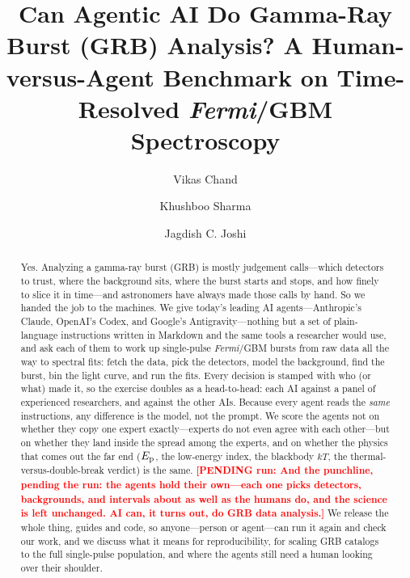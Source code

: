 \documentclass[twocolumn]{aastex631}
\newcommand{\PENDING}[1]{\textbf{\textcolor{red}{[PENDING run: #1]}}}
\newcommand{\Ep}{E_{\rm p}}
\newcommand{\kT}{kT}
\begin{document}
\title{Can Agentic AI Do Gamma-Ray Burst (GRB) Analysis?
A Human-versus-Agent Benchmark on Time-Resolved \textit{Fermi}/GBM Spectroscopy}

\author{Vikas Chand}

\author{Khushboo Sharma}

\author{Jagdish C. Joshi}

\begin{abstract}
Yes. Analyzing a gamma-ray burst (GRB) is mostly judgement calls---which detectors to
trust, where the background sits, where the burst starts and stops, and how finely to
slice it in time---and astronomers have always made those calls by hand. So we handed
the job to the machines. We give today's leading AI agents---Anthropic's Claude,
OpenAI's Codex, and Google's Antigravity---nothing but a set of plain-language
instructions written in Markdown and the same tools a researcher would use, and ask
each of them to work up single-pulse \textit{Fermi}/GBM bursts from raw data all the
way to spectral fits: fetch the data, pick the detectors, model the background, find
the burst, bin the light curve, and run the fits. Every decision is stamped with who
(or what) made it, so the exercise doubles as a head-to-head: each AI against a panel
of experienced researchers, and against the other AIs. Because every agent reads the
\emph{same} instructions, any difference is the model, not the prompt. We score the
agents not on whether they copy one expert exactly---experts do not even agree with
each other---but on whether they land inside the spread among the experts, and on
whether the physics that comes out the far end ($\Ep$, the low-energy index, the
blackbody $\kT$, the thermal-versus-double-break verdict) is the same. \PENDING{And the
punchline, pending the run: the agents hold their own---each one picks detectors,
backgrounds, and intervals about as well as the humans do, and the science is left
unchanged. AI can, it turns out, do GRB data analysis.} We release the whole thing,
guides and code, so anyone---person or agent---can run it again and check our work, and
we discuss what it means for reproducibility, for scaling GRB catalogs to the full
single-pulse population, and where the agents still need a human looking over their
shoulder.
\end{abstract}
\end{document}
